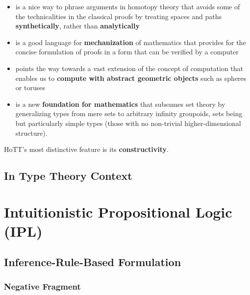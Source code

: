 \documentclass[11pt]{article}
\begin{document}
\begin{itemize}

\item is a nice way to phrase arguments in homotopy theory that avoids some of the technicalities
  in the classical proofs by treating spaces and paths \textbf{synthetically}, rather than
  \textbf{analytically}

\item is a good language for \textbf{mechanization} of mathematics that provides for the concise
  formulation of proofs in a form that can be verified by a computer

\item points the way towards a vast extension of the concept of computation that enables us to
  \textbf{compute with abstract geometric objects} such as spheres or toruses

\item is a new \textbf{foundation for mathematics} that subsumes set theory by generalizing
  types from mere sets to arbitrary infinity groupoids, sets being but particularly simple
  types (those with no non-trivial higher-dimensional structure).

\end{itemize}

HoTT's most distinctive feature is its \textbf{constructivity}.

\subsection{In Type Theory Context}\label{subsec:type_theory_context}

\section{Intuitionistic Propositional Logic (IPL)}\label{sec:ipl}

\subsection{Inference-Rule-Based Formulation}\label{subsec:ipl_rules}


\subsubsection{Negative Fragment}\label{subsubsec:ipl_negfrag}
\end{document}
